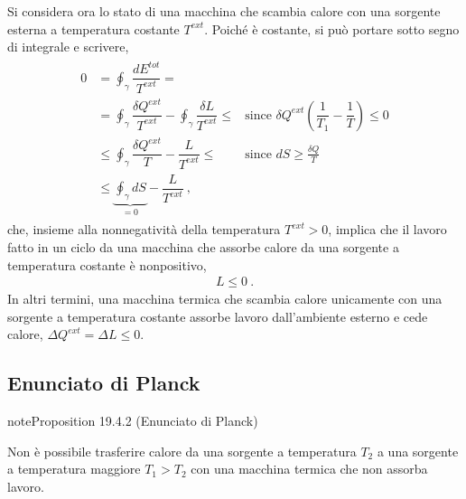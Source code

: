\documentclass[letterpaper,10pt,italian]{jupyterBook}
\begin{document}
\sphinxAtStartPar
Si considera ora lo stato di una macchina che scambia calore con una sorgente esterna a temperatura costante \(T^{ext}\). Poiché è costante, si può portare sotto segno di integrale e scrivere,
\begin{equation*}
\begin{split}\begin{aligned}
  0 & = \oint_{\gamma} \dfrac{d E^{tot}}{T^{ext}} = \\
    & = \oint_{\gamma} \dfrac{\delta Q^{ext}}{T^{ext}} - \oint_{\gamma} \dfrac{\delta L}{T^{ext}} \le & \text{since } \delta Q^{ext} \left(\dfrac{1}{T_1} - \dfrac{1}{T} \right) \le 0 \\
    & \le \oint_{\gamma} \dfrac{\delta Q^{ext}}{T} - \dfrac{L}{T^{ext}} \le & \text{since } dS \ge \frac{\delta Q}{T} \\
    & \le \underbrace{ \oint_{\gamma} d S}_{=0} - \dfrac{L}{T^{ext}} \ , %
\end{aligned}\end{split}
\end{equation*}
\sphinxAtStartPar
che, insieme alla non\sphinxhyphen{}negatività della temperatura \(T^{ext} >0\), implica che il lavoro fatto in un ciclo da una macchina che assorbe calore da una sorgente a temperatura costante è non\sphinxhyphen{}positivo,
\begin{equation*}
\begin{split}L \le 0 \ .\end{split}
\end{equation*}
\sphinxAtStartPar
In altri termini, una macchina termica che scambia calore unicamente con una sorgente a temperatura costante assorbe lavoro dall’ambiente esterno e cede calore, \(\Delta Q^{ext} = \Delta L \le 0\).


\subsection{Enunciato di Planck}
\label{\detokenize{ch/thermodynamics/heat-engine-second-principle:enunciato-di-planck}}\label{\detokenize{ch/thermodynamics/heat-engine-second-principle:physics-hs-thermodynamics-heat-engine-second-principle-planck}}\label{ch/thermodynamics/heat-engine-second-principle:proposition-1}
\begin{sphinxadmonition}{note}{Proposition 19.4.2 (Enunciato di Planck)}



\sphinxAtStartPar
Non è possibile trasferire calore da una sorgente a temperatura \(T_2\) a una sorgente a temperatura maggiore \(T_1 > T_2\) con una macchina termica che non assorba lavoro.
\end{sphinxadmonition}
\end{document}
